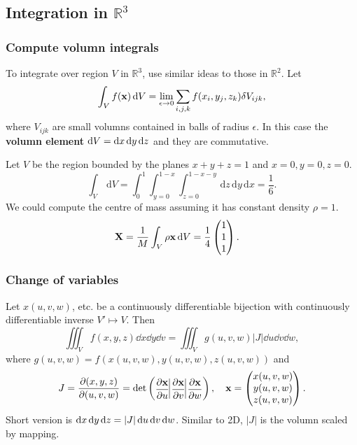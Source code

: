 \subsection{Integration in $ \mathbb{R}^{3} $}
\subsubsection*{Compute volumn integrals}

To integrate over region $V$ in $ \mathbb{R}^{3}$, use similar ideas to those in $ \mathbb{R}^{2} $. Let 
\[
    \int_{V} f({\bf x}) \,\mathrm{d}V = \lim_{\epsilon \to 0} \sum_{i,j,k} f(x_i,y_j,z_k)\delta V_{ijk},
\]
where $ V_{ijk} $ are small volumns contained in balls of radius $\epsilon$. In this case the \textbf{volumn element} $ \mathrm{d} V = \mathrm{d} x\,\mathrm{d} y\,\mathrm{d} z $ and they are commutative.

\begin{example}
    Let $V$ be the region bounded by the planes $ x+y+z=1 $ and $ x=0,y=0,z=0 $.
    \[
        \int_{V} \,\mathrm{d}V = \int_{0}^{1} \int_{y=0}^{1-x} \int_{z=0}^{1-x-y}  \,\mathrm{d}z \,\mathrm{d}y \,\mathrm{d}x
        = \frac{1}{6}.
    \]
    We could compute the centre of mass assuming it has constant density $ \rho=1 $. 
    \begin{align*}
        {\bf X} &= \frac{1}{M} \int_{V} \rho{\bf x} \,\mathrm{d}V = \frac{1}{4}\begin{pmatrix}
            1 \\ 1 \\ 1
        \end{pmatrix}.
    \end{align*}
\end{example}

\subsubsection*{Change of variables}
\begin{proposition}
    Let $ x(u,v,w) $, etc. be a continuously differentiable bijection with continuously differentiable inverse $ V'\mapsto V $. Then 
    \[
        \iiint_{V} f(x,y,z)\dd x\dd y\dd v = \iiint_{V} g(u,v,w)|J|\dd u\dd v\dd w,
    \]
    where $ g(u,v,w)= f(x(u,v,w),y(u,v,w),z(u,v,w))$ and
    \[
        J = \frac{\partial (x,y,z)}{\partial (u,v,w)} = \det \left(\!\!\! \begin{array}{c|c|c}
           \displaystyle \frac{\partial \bfx}{\partial u}\!\!\!&\!\!\displaystyle\frac{\partial \bfx}{\partial v}\!\!\!&\!\!\displaystyle\frac{\partial\bfx}{\partial w}
        \end{array}\!\!\! \right),\quad \bfx = \begin{pmatrix}
            x(u,v,w) \\ y(u,v,w) \\ z(u,v,w)
        \end{pmatrix}.
    \]
    Short version is $ \mathrm{d} x\,\mathrm{d} y\,\mathrm{d} z = |J|\,\mathrm{d} u\,\mathrm{d} v\,\mathrm{d} w $. Similar to 2D, $|J|$ is the volumn scaled by mapping.
\end{proposition}

